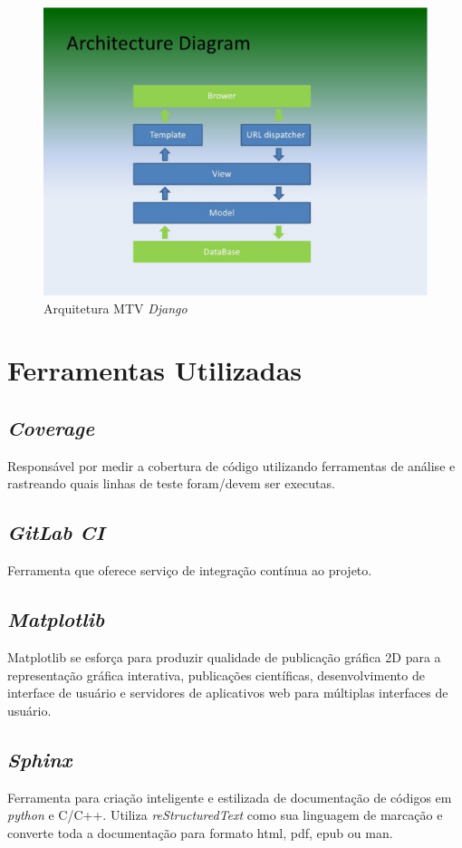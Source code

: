 \begin{figure}[h]
    \centering
    \includegraphics[keepaspectratio=true,scale=0.5]{figuras/django-arquitetura.eps}
    \caption{Arquitetura MTV \textit{Django}}
    \label{django-arq}
\end{figure}

\section{Ferramentas Utilizadas}
    \subsection{\textit{Coverage}}
    Responsável por medir a cobertura de código utilizando ferramentas de análise e rastreando quais
    linhas de teste foram/devem ser executas.

    \subsection{\textit{GitLab CI}}
    Ferramenta que oferece serviço de integração contínua ao projeto.

    \subsection{\textit{Matplotlib}}
    Matplotlib se esforça para produzir qualidade de publicação gráfica 2D para a representação gráfica interativa, publicações científicas, desenvolvimento de interface de usuário e servidores de aplicativos web para múltiplas interfaces de usuário.

    \subsection{\textit{Sphinx}}
    Ferramenta para criação inteligente e estilizada de documentação de códigos em \textit{python} e C/C++. Utiliza \textit{reStructuredText} como sua linguagem de marcação e converte toda a documentação
    para formato html, pdf, epub ou man.

